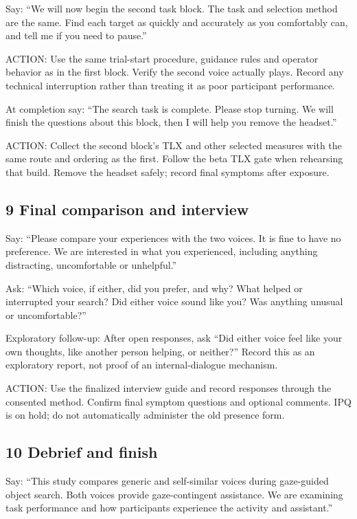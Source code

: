 Say: ``We will now begin the second task block. The task and selection
method are the same. Find each target as quickly and accurately as you
comfortably can, and tell me if you need to pause.''

ACTION: Use the same trial-start procedure, guidance rules and operator
behavior as in the first block. Verify the second voice actually plays.
Record any technical interruption rather than treating it as poor
participant performance.

At completion say: ``The search task is complete. Please stop turning.
We will finish the questions about this block, then I will help you
remove the headset.''

ACTION: Collect the second block's TLX and other selected measures with
the same route and ordering as the first. Follow the beta TLX gate when
rehearsing that build. Remove the headset safely; record final symptoms
after exposure.

\subsection{9 Final comparison and
interview}\label{final-comparison-and-interview}

Say: ``Please compare your experiences with the two voices. It is fine
to have no preference. We are interested in what you experienced,
including anything distracting, uncomfortable or unhelpful.''

Ask: ``Which voice, if either, did you prefer, and why? What helped or
interrupted your search? Did either voice sound like you? Was anything
unusual or uncomfortable?''

Exploratory follow-up: After open responses, ask ``Did either voice feel
like your own thoughts, like another person helping, or neither?''
Record this as an exploratory report, not proof of an internal-dialogue
mechanism.

ACTION: Use the finalized interview guide and record responses through
the consented method. Confirm final symptom questions and optional
comments. IPQ is on hold; do not automatically administer the old
presence form.

\subsection{10 Debrief and finish}\label{debrief-and-finish}

Say: ``This study compares generic and self-similar voices during
gaze-guided object search. Both voices provide gaze-contingent
assistance. We are examining task performance and how participants
experience the activity and assistant.''

